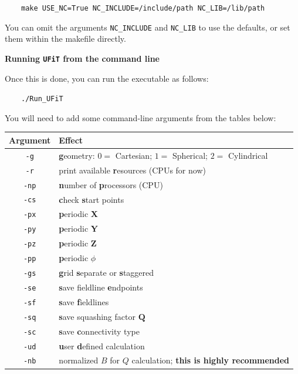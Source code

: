 \documentclass[12pt,twoside]{article}
\begin{document}
$\quad\quad$\texttt{make USE\_NC=True NC\_INCLUDE=/include/path NC\_LIB=/lib/path}

You can omit the arguments \texttt{NC\_INCLUDE} and \texttt{NC\_LIB} to use the defaults, or set them within the makefile directly.


\vspace{2mm}
{\Large \textbf{Running \texttt{UFiT} from the command line}}

Once this is done, you can run the executable as follows: 

$\quad\quad$\texttt{./Run\_UFiT}

You will need to add some command-line arguments from the tables below:

\vspace{2mm}

\begin{tabular}{|c|l|}		
		\hline
		\textbf{Argument} & \textbf{Effect} \\\hline\hline
		\texttt{-g} & \textbf{g}eometry: $0 =$ Cartesian; $1 =$ Spherical; $2 =$ Cylindrical  \\\hline
		\texttt{-r} & print available \textbf{r}esources (CPUs for now) \\\hline
		\texttt{-np} &  \textbf{n}umber of \textbf{p}rocessors (CPU) \\\hline
		\texttt{-cs} & \textbf{c}heck \textbf{s}tart points \\\hline
		\texttt{-px} & \textbf{p}eriodic \textbf{X} \\\hline
		\texttt{-py} & \textbf{p}eriodic \textbf{Y}  \\\hline
		\texttt{-pz} & \textbf{p}eriodic \textbf{Z}  \\\hline
		\texttt{-pp} & \textbf{p}eriodic $\phi$  \\\hline
		\texttt{-gs} & \textbf{g}rid \textbf{s}eparate or \textbf{s}taggered  \\\hline
		\texttt{-se} & \textbf{s}ave fieldline \textbf{e}ndpoints \\\hline
		\texttt{-sf} & \textbf{s}ave \textbf{f}ieldlines \\\hline
		\texttt{-sq} & \textbf{s}ave squashing factor $\mathbf{Q}$  \\\hline
		\texttt{-sc} & \textbf{s}ave \textbf{c}onnectivity type  \\\hline
		\texttt{-ud} & \textbf{u}ser \textbf{d}efined calculation  \\\hline
		\texttt{-nb} & normalized $B$ for $Q$ calculation; \textbf{this is highly recommended} \\\hline

\end{tabular}
\end{document}
